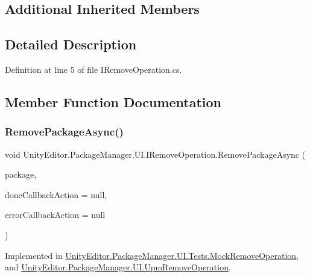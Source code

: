 \subsection*{Additional Inherited Members}


\subsection{Detailed Description}


Definition at line 5 of file I\+Remove\+Operation.\+cs.



\subsection{Member Function Documentation}
\mbox{\label{interface_unity_editor_1_1_package_manager_1_1_u_i_1_1_i_remove_operation_a83f4739b21051b92ceb18336953a6af1}} 
\subsubsection{\texorpdfstring{RemovePackageAsync()}{RemovePackageAsync()}}
{\footnotesize\ttfamily void Unity\+Editor.\+Package\+Manager.\+U\+I.\+I\+Remove\+Operation.\+Remove\+Package\+Async (\begin{DoxyParamCaption}\item[{\mbox{\hyperlink{class_unity_editor_1_1_package_manager_1_1_u_i_1_1_package_info}{Package\+Info}}}]{package,  }\item[{Action$<$ \mbox{\hyperlink{class_unity_editor_1_1_package_manager_1_1_u_i_1_1_package_info}{Package\+Info}} $>$}]{done\+Callback\+Action = {\ttfamily null},  }\item[{Action$<$ \mbox{\hyperlink{namespace_unity_editor_1_1_package_manager_1_1_u_i_ab1815eb3e48074893d9dc1dc99a4a32aa902b0d55fddef6f8d651fe1035b7d4bd}{Error}} $>$}]{error\+Callback\+Action = {\ttfamily null} }\end{DoxyParamCaption})}



Implemented in \mbox{\hyperlink{class_unity_editor_1_1_package_manager_1_1_u_i_1_1_tests_1_1_mock_remove_operation_a6eb0a7297483a1f4a62cbbc890f0b843}{Unity\+Editor.\+Package\+Manager.\+U\+I.\+Tests.\+Mock\+Remove\+Operation}}, and \mbox{\hyperlink{class_unity_editor_1_1_package_manager_1_1_u_i_1_1_upm_remove_operation_ae89c3c2cc15ae8f769276685b775eea6}{Unity\+Editor.\+Package\+Manager.\+U\+I.\+Upm\+Remove\+Operation}}.



